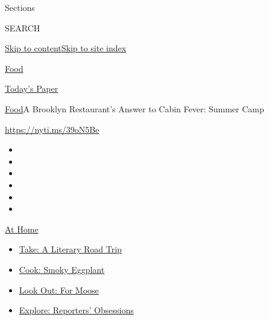 Sections

SEARCH

\protect\hyperlink{site-content}{Skip to
content}\protect\hyperlink{site-index}{Skip to site index}

\href{https://www.nytimes3xbfgragh.onion/section/food}{Food}

\href{https://myaccount.nytimes3xbfgragh.onion/auth/login?response_type=cookie\&client_id=vi}{}

\href{https://www.nytimes3xbfgragh.onion/section/todayspaper}{Today's
Paper}

\href{/section/food}{Food}\textbar{}A Brooklyn Restaurant's Answer to
Cabin Fever: Summer Camp

\url{https://nyti.ms/39oN5Be}

\begin{itemize}
\item
\item
\item
\item
\item
\item
\end{itemize}

\href{https://www.nytimes3xbfgragh.onion/spotlight/at-home?action=click\&pgtype=Article\&state=default\&region=TOP_BANNER\&context=at_home_menu}{At
Home}

\begin{itemize}
\tightlist
\item
  \href{https://www.nytimes3xbfgragh.onion/2020/07/28/books/time-for-a-literary-road-trip.html?action=click\&pgtype=Article\&state=default\&region=TOP_BANNER\&context=at_home_menu}{Take:
  A Literary Road Trip}
\item
  \href{https://www.nytimes3xbfgragh.onion/2020/07/29/magazine/bored-with-your-home-cooking-some-smoky-eggplant-will-fix-that.html?action=click\&pgtype=Article\&state=default\&region=TOP_BANNER\&context=at_home_menu}{Cook:
  Smoky Eggplant}
\item
  \href{https://www.nytimes3xbfgragh.onion/2020/07/27/travel/moose-michigan-isle-royale.html?action=click\&pgtype=Article\&state=default\&region=TOP_BANNER\&context=at_home_menu}{Look
  Out: For Moose}
\item
  \href{https://www.nytimes3xbfgragh.onion/interactive/2020/at-home/even-more-reporters-editors-diaries-lists-recommendations.html?action=click\&pgtype=Article\&state=default\&region=TOP_BANNER\&context=at_home_menu}{Explore:
  Reporters' Obsessions}
\end{itemize}

